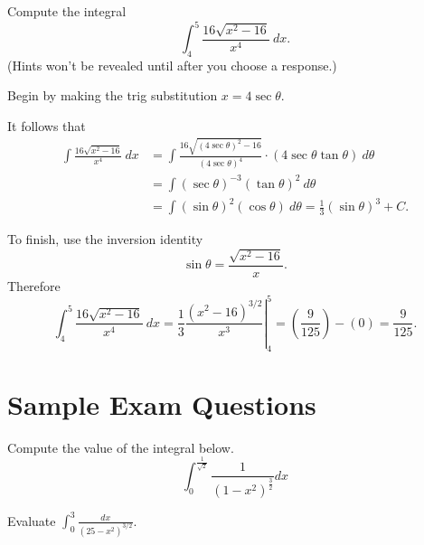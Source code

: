\documentclass{ximera}
\begin{document}
\begin{question}%

Compute the integral 
\[\int_{4}^{5}\frac{16\sqrt{x^2-16}}{x^{4}}~dx.\]
(Hints won't be revealed until after you choose a response.)
\begin{multiplechoice}
\end{multiplechoice}
\begin{feedback}
Begin by making the trig substitution \(x=4\sec \theta\). \begin{hint} It follows that 
\[ \begin{aligned} \int\frac{16\sqrt{x^2-16}}{x^{4}}~dx & = \int \frac{16\sqrt{(4\sec \theta)^2-16}}{(4\sec \theta)^{4}} \cdot (4\sec \theta\tan \theta)~d \theta \\
 & = \int (\sec \theta)^{-3}(\tan \theta)^{2}~d \theta \\ & = \int (\sin \theta)^{2}(\cos \theta) ~ d \theta = \frac{1}{3}(\sin \theta)^{3} + C. \end{aligned} \] \begin{hint}
To finish, use the inversion identity \[\sin \theta = \frac{\sqrt{x^2-16}}{x}.\]
Therefore \[\int_{4}^{5}\frac{16\sqrt{x^2-16}}{x^{4}}~dx = \left.\frac{1}{3}\frac{(x^2-16)^{3/2}}{x^{3}}\right|_{4}^{5} = \left(\frac{9}{125}\right) - \left(0\right) = \frac{9}{125}.\] \end{hint} \end{hint}
\end{feedback}

\end{question}



\section*{Sample Exam Questions}

\begin{question}%

Compute the value of the integral below.
\[ \int_0^{\frac{1}{\sqrt{2}}} \frac{1}{(1-x^2)^{\frac{3}{2}}} dx \]
\begin{multiplechoice}
\end{multiplechoice}

\end{question}

\begin{question}%

Evaluate \(\displaystyle \int_0^3 \frac{dx}{(25-x^2)^{3/2}}\).
\begin{multiplechoice}
\end{multiplechoice}

\end{question}
\end{document}
